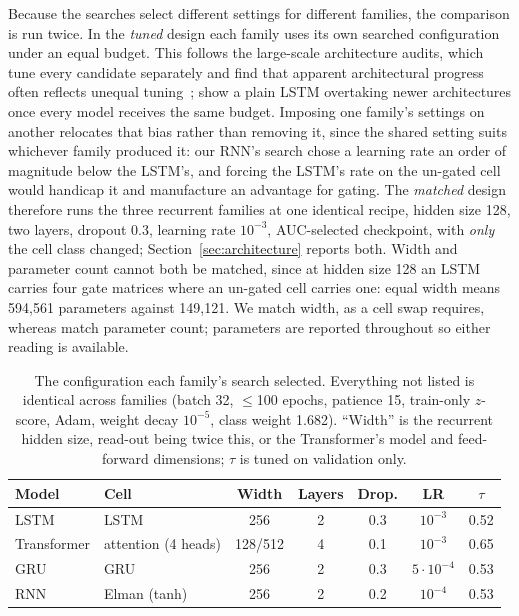 \documentclass[mti,article,submit,moreauthors]{Definitions/mdpi}
\begin{document}
Because the searches select different settings for different families, the comparison is run twice. In the \emph{tuned} design each family uses its own searched configuration under an equal budget. This follows the large-scale architecture audits, which tune every candidate separately and find that apparent architectural progress often reflects unequal tuning~\citep{greff2017odyssey,lucic2018gans}; \citet{melis2018sota} show a plain LSTM overtaking newer architectures once every model receives the same budget. Imposing one family's settings on another relocates that bias rather than removing it, since the shared setting suits whichever family produced it: our RNN's search chose a learning rate an order of magnitude below the LSTM's, and forcing the LSTM's rate on the un-gated cell would handicap it and manufacture an advantage for gating. The \emph{matched} design therefore runs the three recurrent families at one identical recipe, hidden size 128, two layers, dropout 0.3, learning rate $10^{-3}$, AUC-selected checkpoint, with \emph{only} the cell class changed; Section~\ref{sec:architecture} reports both. Width and parameter count cannot both be matched, since at hidden size 128 an LSTM carries four gate matrices where an un-gated cell carries one: equal width means 594,561 parameters against 149,121. We match width, as a cell swap requires, whereas \citet{chung2014gru} match parameter count; parameters are reported throughout so either reading is available.

\begin{table}[htbp]
\caption{The configuration each family's search selected. Everything not listed is identical across families (batch 32, $\le$100 epochs, patience 15, train-only $z$-score, Adam, weight decay $10^{-5}$, class weight 1.682). ``Width'' is the recurrent hidden size, read-out being twice this, or the Transformer's model and feed-forward dimensions; $\tau$ is tuned on validation only.\label{tab:hparams}}
\begin{tabularx}{\textwidth}{Llccccc}
\toprule
\textbf{Model} & \textbf{Cell} & \textbf{Width} & \textbf{Layers} & \textbf{Drop.} & \textbf{LR} & \textbf{$\tau$}\\
\midrule
LSTM & LSTM & 256 & 2 & 0.3 & $10^{-3}$ & 0.52\\
Transformer & attention (4 heads) & 128/512 & 4 & 0.1 & $10^{-3}$ & 0.65\\
GRU & GRU & 256 & 2 & 0.3 & $5{\cdot}10^{-4}$ & 0.53\\
RNN & Elman (tanh) & 256 & 2 & 0.2 & $10^{-4}$ & 0.53\\
\bottomrule
\end{tabularx}
\end{table}
\end{document}
